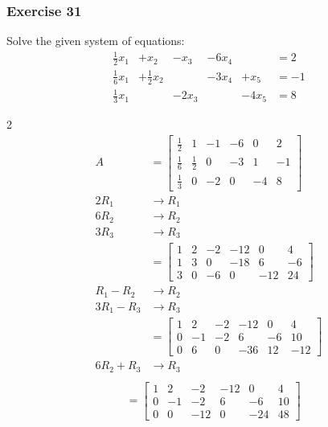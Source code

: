 \documentclass[letterpaper, 12pt]{math}
\begin{document}
\subsubsection*{Exercise 31}
Solve the given system of equations:
\[ \begin{alignedat}{4}
  \frac{1}{2}x_1 &+x_2 &-x_3 &-6x_4 & &= 2 \\
  \frac{1}{6}x_1 &+\frac{1}{2}x_2 & &-3x_4 &+x_5 &= -1 \\
  \frac{1}{3}x_1 & &-2x_3 & &-4x_5 &= 8
\end{alignedat} \]
\newpage
\begingroup
\renewcommand*{\arraystretch}{1.5}
\begin{multicols}{2}
  \begin{align*}
    A &= \begin{bmatrix}
      \frac{1}{2} & 1 & -1 & -6 & 0 & 2 \\
      \frac{1}{6} & \frac{1}{2} & 0 & -3 & 1 & -1 \\
      \frac{1}{3} & 0 & -2 & 0 & -4 & 8
    \end{bmatrix} \\
    2R_1 &\to R_1 \\
    6R_2 &\to R_2 \\
    3R_3 &\to R_3 \\
    &= \begin{bmatrix}
      1 & 2 & -2 & -12 & 0 & 4 \\
      1 & 3 & 0 & -18 & 6 & -6 \\
      3 & 0 & -6 & 0 & -12 & 24
    \end{bmatrix} \\
    R_1-R_2 &\to R_2 \\
    3R_1-R_3 &\to R_3 \\
    &= \begin{bmatrix}
      1 & 2 & -2 & -12 & 0 & 4 \\
      0 & -1 & -2 & 6 & -6 & 10 \\
      0 & 6 & 0 & -36 & 12 & -12
    \end{bmatrix} \\
    6R_2+R_3 &\to R_3 \\
  \end{align*}
  \begin{align*}
    &= \begin{bmatrix}
      1 & 2 & -2 & -12 & 0 & 4 \\
      0 & -1 & -2 & 6 & -6 & 10 \\
      0 & 0 & -12 & 0 & -24 & 48
    \end{bmatrix} \\

\end{align*}
\end{multicols}
\end{document}
